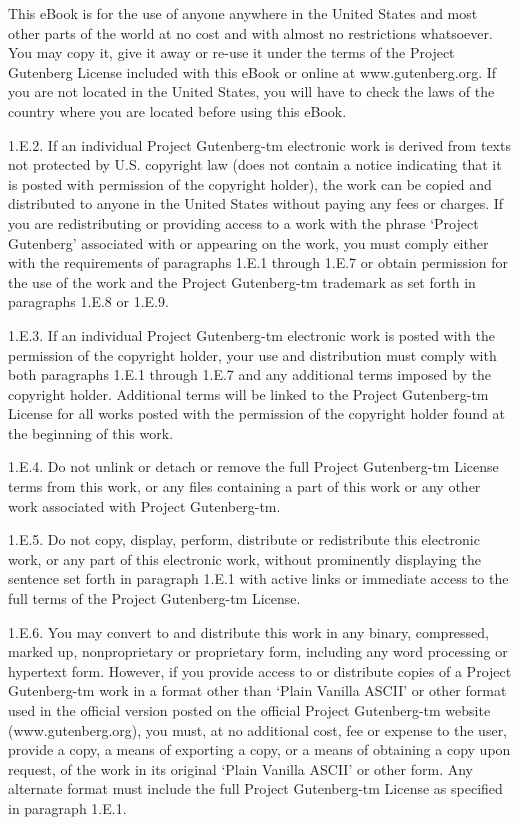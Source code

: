 \documentclass[oneside]{book}
\begin{document}
\begin{text}
  This eBook is for the use of anyone anywhere in the United States and
  most other parts of the world at no cost and with almost no
  restrictions whatsoever. You may copy it, give it away or re-use it
  under the terms of the Project Gutenberg License included with this
  eBook or online at www.gutenberg.org. If you are not located in the
  United States, you will have to check the laws of the country where
  you are located before using this eBook.

1.E.2. If an individual Project Gutenberg-tm electronic work is
derived from texts not protected by U.S. copyright law (does not
contain a notice indicating that it is posted with permission of the
copyright holder), the work can be copied and distributed to anyone in
the United States without paying any fees or charges. If you are
redistributing or providing access to a work with the phrase `Project
Gutenberg' associated with or appearing on the work, you must comply
either with the requirements of paragraphs 1.E.1 through 1.E.7 or
obtain permission for the use of the work and the Project Gutenberg-tm
trademark as set forth in paragraphs 1.E.8 or 1.E.9.

1.E.3. If an individual Project Gutenberg-tm electronic work is posted
with the permission of the copyright holder, your use and distribution
must comply with both paragraphs 1.E.1 through 1.E.7 and any
additional terms imposed by the copyright holder. Additional terms
will be linked to the Project Gutenberg-tm License for all works
posted with the permission of the copyright holder found at the
beginning of this work.

1.E.4. Do not unlink or detach or remove the full Project Gutenberg-tm
License terms from this work, or any files containing a part of this
work or any other work associated with Project Gutenberg-tm.

1.E.5. Do not copy, display, perform, distribute or redistribute this
electronic work, or any part of this electronic work, without
prominently displaying the sentence set forth in paragraph 1.E.1 with
active links or immediate access to the full terms of the Project
Gutenberg-tm License.

1.E.6. You may convert to and distribute this work in any binary,
compressed, marked up, nonproprietary or proprietary form, including
any word processing or hypertext form. However, if you provide access
to or distribute copies of a Project Gutenberg-tm work in a format
other than `Plain Vanilla ASCII' or other format used in the official
version posted on the official Project Gutenberg-tm website
(www.gutenberg.org), you must, at no additional cost, fee or expense
to the user, provide a copy, a means of exporting a copy, or a means
of obtaining a copy upon request, of the work in its original `Plain
Vanilla ASCII' or other form. Any alternate format must include the
full Project Gutenberg-tm License as specified in paragraph 1.E.1.


\end{text}
\end{document}
